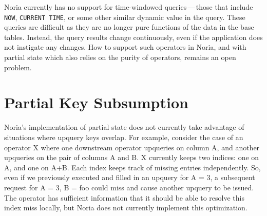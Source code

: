 Noria currently has no support for time-windowed queries\,---\,those that
include \texttt{NOW}, \texttt{CURRENT TIME}, or some other similar dynamic value
in the query. These queries are difficult as they are no longer pure functions
of the data in the base tables. Instead, the query results change continuously,
even if the application does not instigate any changes. How to support such
operators in Noria, and with partial state which also relies on the purity of
operators, remains an open problem.

\section{Partial Key Subsumption}

Noria's implementation of partial state does not currently take advantage of
situations where upquery keys overlap. For example, consider the case of an
operator X where one downstream operator upqueries on column A, and another
upqueries on the pair of columns A and B. X currently keeps two indices: one on
A, and one on A+B. Each index keeps track of missing entries independently. So,
even if we previously executed and filled in an upquery for A = 3, a subsequent
request for A = 3, B = foo could miss and cause another upquery to be issued.
The operator has sufficient information that it should be able to resolve this
index miss locally, but Noria does not currently implement this optimization.
